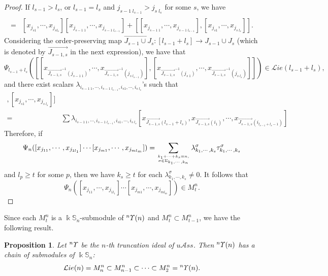 \documentclass{amsart}
\newtheorem{prop}[thm]{Proposition}
\theoremstyle{definition}
\theoremstyle{remark}
\numberwithin{equation}{section}
\def\S{\mathbb{S}}
\newcommand{\up}[1]{{^{#1}{\it \!\Upsilon}}}
\def\la{\lambda}
\def \uas{u\mathcal{A}ss}
\def \Lie{\mathcal{L}ie}
\def \S{\mathbb{S}}
\begin{document}
\begin{proof}
	If $l_{s-1}>l_s$, or 
	$l_{s-1}=l_s$ and $j_{s-1\; l_{s-1}}>j_{s\; l_s}$ for some $s$, 
	we have
	\begin{align*}
		[x_{j_{s-1\;1}}, \cdots, &x_{j_{s-1\; l_{s-1}}}]
		[x_{j_{s1}}, \cdots, x_{j_{s\; l_{s}}}]\\
		=& [x_{j_{s1}}, \cdots, x_{j_{sl_{s}}}]
		[x_{j_{s-1\; 1}}, \cdots, x_{j_{s-1\; l_{s-1}}}]+[[x_{j_{s-1\; 1}}, 
		\cdots, x_{j_{s-1\; l_{s-1}}}], 
		[x_{j_{s1}}, \cdots, x_{j_{s\; l_{s}}}] ].
	\end{align*}
	Considering the order-preserving map 
	$\overrightarrow{J_{s-1}\cup J_{s}}\colon 
	[l_{s-1}+l_s]\to J_{s-1}\cup J_{s}$ (which is denoted by 
	$\overrightarrow{J_{s-1,s}}$ in the next expression),
	we have that 
	\[\Psi_{l_{s-1}+l_s}([[x_{\overrightarrow{J_{s-1,s}}^{-1}(j_{s-1\;1})}, 
	\cdots, x_{\overrightarrow{J_{s-1,s}}^{-1}(j_{s\;l_{s-1}})}], 
	[x_{\overrightarrow{J_{s-1,s}}^{-1}(j_{s\;1})}, \cdots, 
	x_{\overrightarrow{J_{s-1,s}}^{-1}(j_{s\;l_{s}})}]])\in 
	\Lie(l_{s-1}+l_s),\]
	and there exist scalars $\la_{i_{s-1\;1}, \cdots, i_{s-1\; l_{s-1}}, 
		i_{s1}, \cdots, i_{s\; l_s}}$'s such that 
	\begin{align*}
		[[x_{j_{s-1\; 1}}, \cdots, & x_{j_{s-1\; l_{s-1}}}], 
		[x_{j_{s1}}, \cdots, x_{j_{s\; l_{s}}}] ]\\
		=& \sum \la_{i_{s-1\;1}, \cdots, i_{s-1\; l_{s-1}}, i_{s1}, 
			\cdots, i_{s\; l_s}} 
		[x_{\overrightarrow{J_{s-1,s}}(l_{s-1}+l_s)},
		x_{\overrightarrow{J_{s-1,s}}(i_1)}, \cdots, 
		x_{\overrightarrow{J_{s-1,s}}(i_{l_{s-1}+l_s-1})}]
	\end{align*}
	Therefore, if
	\begin{align*}
		\Psi_n([x_{j_{11}}, \cdots, x_{j_{1l_1}}]\cdots 
		[x_{j_{m1}}, \cdots, x_{j_{ml_m}}])	
		=\sum_{k_1+\cdots+k_s=n,\atop \sigma\in \Sigma_{k_1, \cdots, k_n}}
		\la^\sigma_{k_1, \cdots, k_s} \tau^\sigma_{k_1, \cdots, k_s}
	\end{align*} 
	and $l_p\ge t$ for some $p$, then we have $k_s\ge t$ for 
	each $\la^\sigma_{k_1, \cdots, k_s}\neq 0$. It follows that 
	\[\Psi_n([x_{j_{11}}, \cdots, x_{j_{1l_1}}]\cdots 
	[x_{j_{m1}}, \cdots, x_{j_{ml_m}}])\in M_t^n.\] 
\end{proof}

Since each $M_t^n$ is a $\Bbbk\S_n$-submodule of $\up{n}(n)$ 
and $M_t^n\subset M_{t-1}^n$, we have the following result. 

\begin{prop}
	\label{yypro3.5}
	Let $\up{n}$ be the $n$-th truncation ideal of $\uas$. Then 
	$\up{n}(n)$ has a chain of submodules of $\Bbbk\S_n$:
	\[\Lie(n)=M^n_n\subset M^n_{n-1}\subset \cdots 
	\subset M^n_{2}=\up{n}(n).\]
\end{prop}
\end{document}
